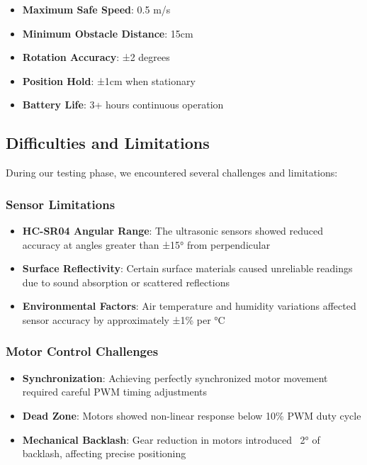 \documentclass{article}
\begin{document}
\begin{itemize}
    \item \textbf{Maximum Safe Speed}: 0.5 m/s
    \item \textbf{Minimum Obstacle Distance}: 15cm
    \item \textbf{Rotation Accuracy}: ±2 degrees
    \item \textbf{Position Hold}: ±1cm when stationary
    \item \textbf{Battery Life}: 3+ hours continuous operation
\end{itemize}

\subsection{Difficulties and Limitations}
During our testing phase, we encountered several challenges and limitations:

\subsubsection{Sensor Limitations}
\begin{itemize}
    \item \textbf{HC-SR04 Angular Range}: The ultrasonic sensors showed reduced accuracy at angles greater than ±15° from perpendicular
    \item \textbf{Surface Reflectivity}: Certain surface materials caused unreliable readings due to sound absorption or scattered reflections
    \item \textbf{Environmental Factors}: Air temperature and humidity variations affected sensor accuracy by approximately ±1\% per °C
\end{itemize}

\subsubsection{Motor Control Challenges}
\begin{itemize}
    \item \textbf{Synchronization}: Achieving perfectly synchronized motor movement required careful PWM timing adjustments
    \item \textbf{Dead Zone}: Motors showed non-linear response below 10\% PWM duty cycle
    \item \textbf{Mechanical Backlash}: Gear reduction in motors introduced ~2° of backlash, affecting precise positioning
\end{itemize}
\end{document}
